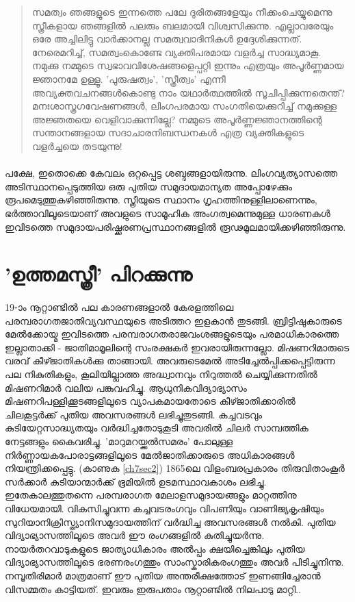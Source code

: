 \begin{quotation}
\noindent സമത്വം ഞങ്ങളുടെ ഇന്നത്തെ പലേ ദുരിതങ്ങളേയും നീക്കംചെയ്യുമെന്നു സ്ത്രീകളായ ഞങ്ങളിൽ പലരും ബലമായി വിശ്വസിക്കുന്നു. എല്ലാവരേയും ഒരേ അച്ചിലിട്ടു വാർക്കാനല്ല സമത്വവാദിനികൾ ഉദ്ദേശിക്കുന്നത്. നേരെമറിച്ച്, സമത്വംകൊണ്ടേ വ്യക്തിപരമായ വളർച്ച സാദ്ധ്യമാകൂ. നമുക്കു നമ്മുടെ സ്വഭാവവിശേഷങ്ങളെപ്പറ്റി ഇന്നും എത്രയും അപൂർണ്ണമായ ജ്ഞാനമേ ഉള്ളൂ. 'പുരുഷത്വം', 'സ്ത്രീത്വം' എന്നീ അവ്യക്തവചനങ്ങൾകൊണ്ടു നാം യഥാർത്ഥത്തിൽ സൂചിപ്പിക്കുന്നതെന്ത്? മനഃശാസ്ത്രഗവേഷണങ്ങൾ, ലിംഗപരമായ സംഗതിയെക്കുറിച്ച് നമുക്കുള്ള അജ്ഞതയെ വെളിവാക്കുന്നില്ലേ? നമ്മുടെ അപൂർണ്ണജ്ഞാനത്തിന്റെ സന്താനങ്ങളായ സദാചാരനിബന്ധനകൾ എത്ര വ്യക്തികളുടെ വളർച്ചയെ തടയുന്നു!

\end{quotation}


\paragraph{}പക്ഷേ, ഇതൊക്കെ കേവലം ഒറ്റപ്പെട്ട ശബ്ദങ്ങളായിരുന്നു. ലിംഗവ്യത്യാസത്തെ അടിസ്ഥാനപ്പെടുത്തിയ ഒരു പുതിയ സമുദായമാന്യത അപ്പോഴേക്കും രൂപമെടുത്തുകഴിഞ്ഞിരുന്നു. സ്ത്രീയുടെ സ്ഥാനം ഗൃഹത്തിനുള്ളിലാണെന്നും, ഭർത്താവിലൂടെയാണ് അവളുടെ സാമൂഹിക അംഗത്വമെന്നുമുള്ള ധാരണകൾ ഇവിടത്തെ സമുദായപരിഷ്ക്കരണപ്രസ്ഥാനങ്ങളിൽ രൂഢമൂലമായിക്കഴിഞ്ഞിരുന്നു.


\section{'ഉത്തമസ്ത്രീ' പിറക്കുന്നു}
\label{ch4sec2}
\paragraph{}19-ാം നൂറ്റാണ്ടിൽ പല കാരണങ്ങളാൽ കേരളത്തിലെ പരമ്പരാഗതജാതിവ്യവസ്ഥയുടെ അടിത്തറ ഇളകാൻ തുടങ്ങി. ബ്രിട്ടിഷുകാരുടെ മേൽക്കോയ്മ ഇവിടത്തെ പരമ്പരാഗതരാജവംശങ്ങളുടെയും പരമാധികാരത്തെ ഇല്ലാതാക്കി - ജാതിമാമൂലിന്റെ സംരക്ഷകർ ഇവരായിരുന്നല്ലോ. മിഷണറിമാരുടെ വരവ് കീഴ്ജാതികൾക്കു താങ്ങായി. അവരുടെമേൽ അടിച്ചേൽപ്പിക്കപ്പെട്ടിരുന്ന പല നികുതികളും, കൂലിയില്ലാത്ത അദ്ധ്വാനവും നിറുത്തൽ ചെയ്യിക്കുന്നതിൽ മിഷണറിമാർ വലിയ പങ്കുവഹിച്ചു. ആധുനികവിദ്യാഭ്യാസം മിഷണറിപള്ളിക്കൂടങ്ങളിലൂടെ വ്യാപകമായതോടെ കീഴ്ജാതിക്കാരിൽ ചിലകൂട്ടർക്ക് പുതിയ അവസരങ്ങൾ ലഭിച്ചുതുടങ്ങി. കച്ചവടവും കുടിയേറ്റസാദ്ധ്യതയും വർദ്ധിച്ചതോടുകൂടി അവരിൽ ചിലർ സാമ്പത്തിക നേട്ടങ്ങളും കൈവരിച്ചു. 'മാറുമറയ്ക്കൽസമരം' പോലുള്ള നിർണ്ണായകപോരാട്ടങ്ങളിലൂടെ മേൽജാതിക്കാരുടെ അധികാരങ്ങൾ നിയന്ത്രിക്കപ്പെട്ടു. (കാണുക \ref{ch7sec2}) 1865ലെ വിളംബരപ്രകാരം തിരുവിതാംകൂർ സർക്കാർ കുടിയാന്മാർക്ക് ഭൂമിയിൽ ഉടമസ്ഥാവകാശം ലഭിച്ചു. ഇതേകാലത്തുതന്നെ പരമ്പരാഗത മേലാളസമുദായങ്ങളും മാറ്റത്തിനു വിധേയമായി. വികസിച്ചുവന്ന കച്ചവടരംഗവും വിപണിയും വാണിജ്യകൃഷിയും സുറിയാനിക്രിസ്ത്യാനിസമുദായത്തിന് വർദ്ധിച്ച അവസരങ്ങൾ നൽകി. പുതിയ വിദ്യാഭ്യാസത്തിലൂടെ അവർ ഈ രംഗങ്ങളിൽ കുതിച്ചുയർന്നു. നായർതറവാടുകളുടെ ജാത്യാധികാരം അൽപ്പം ക്ഷയിച്ചെങ്കിലും പുതിയ വിദ്യാഭ്യാസത്തിലൂടെ ഭരണരംഗത്തും സാംസ്കാരികരംഗത്തും അവർ പിടിച്ചുനിന്നു. നമ്പൂതിരിമാർ മാത്രമാണ് ഈ പുതിയ അന്തരീക്ഷത്തോട് ഇണങ്ങിച്ചേരാൻ വിസമ്മതം കാട്ടിയത്. ഇവരും ഇരുപതാം നൂറ്റാണ്ടിൽ നിലപാടു മാറ്റി..

